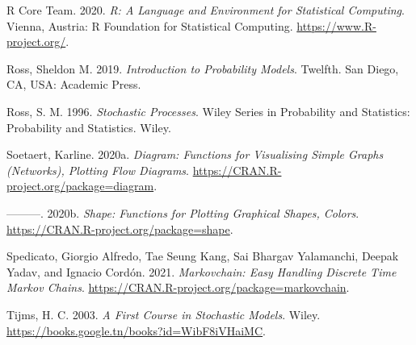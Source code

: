 \documentclass[
]{book}
\theoremstyle{definition}
\theoremstyle{definition}
\theoremstyle{definition}
\theoremstyle{remark}
\begin{document}
\leavevmode\hypertarget{ref-R-base}{}%
R Core Team. 2020. \emph{R: A Language and Environment for Statistical Computing}. Vienna, Austria: R Foundation for Statistical Computing. \url{https://www.R-project.org/}.

\leavevmode\hypertarget{ref-Ross97}{}%
Ross, Sheldon M. 2019. \emph{Introduction to Probability Models}. Twelfth. San Diego, CA, USA: Academic Press.

\leavevmode\hypertarget{ref-ross1996stochastic}{}%
Ross, S. M. 1996. \emph{Stochastic Processes}. Wiley Series in Probability and Statistics: Probability and Statistics. Wiley.

\leavevmode\hypertarget{ref-R-diagram}{}%
Soetaert, Karline. 2020a. \emph{Diagram: Functions for Visualising Simple Graphs (Networks), Plotting Flow Diagrams}. \url{https://CRAN.R-project.org/package=diagram}.

\leavevmode\hypertarget{ref-R-shape}{}%
---------. 2020b. \emph{Shape: Functions for Plotting Graphical Shapes, Colors}. \url{https://CRAN.R-project.org/package=shape}.

\leavevmode\hypertarget{ref-R-markovchain}{}%
Spedicato, Giorgio Alfredo, Tae Seung Kang, Sai Bhargav Yalamanchi, Deepak Yadav, and Ignacio Cordón. 2021. \emph{Markovchain: Easy Handling Discrete Time Markov Chains}. \url{https://CRAN.R-project.org/package=markovchain}.

\leavevmode\hypertarget{ref-tijms2003first}{}%
Tijms, H. C. 2003. \emph{A First Course in Stochastic Models}. Wiley. \url{https://books.google.tn/books?id=WibF8iVHaiMC}.
\end{document}
